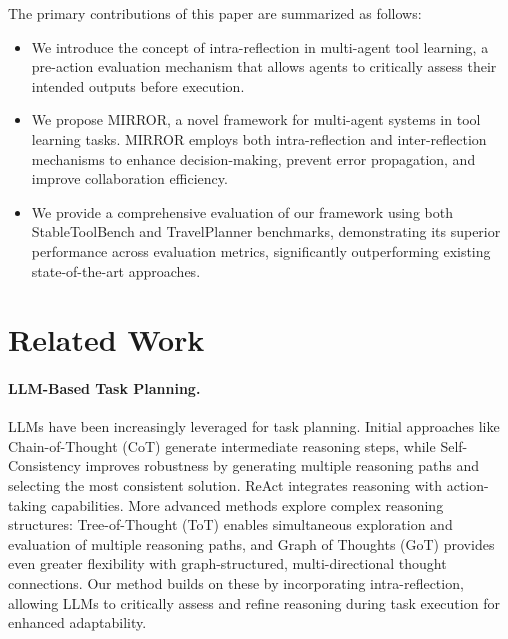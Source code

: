 \documentclass{article}
\begin{document}
The primary contributions of this paper are summarized as follows:

\begin{itemize}
\item We introduce the concept of intra-reflection in multi-agent tool learning, a pre-action evaluation mechanism that allows agents to critically assess their intended outputs before execution. 
\item We propose MIRROR, a novel framework for multi-agent systems in tool learning tasks. MIRROR employs both intra-reflection and inter-reflection mechanisms to enhance decision-making, prevent error propagation, and improve collaboration efficiency. 
\item We provide a comprehensive evaluation of our framework using both StableToolBench and TravelPlanner benchmarks, demonstrating its superior performance across evaluation metrics, significantly outperforming existing state-of-the-art approaches.
\end{itemize}

\section{Related Work}
\paragraph{LLM-Based Task Planning.} 
LLMs have been increasingly leveraged for task planning. Initial approaches like Chain-of-Thought (CoT) \cite{wei2022chain} generate intermediate reasoning steps, while Self-Consistency \cite{wang2022self} improves robustness by generating multiple reasoning paths and selecting the most consistent solution. ReAct \cite{yao2022react} integrates reasoning with action-taking capabilities. More advanced methods explore complex reasoning structures: Tree-of-Thought (ToT) \cite{yao2024tree} enables simultaneous exploration and evaluation of multiple reasoning paths, and Graph of Thoughts (GoT) \cite{besta2024graph} provides even greater flexibility with graph-structured, multi-directional thought connections. Our method builds on these by incorporating intra-reflection, allowing LLMs to critically assess and refine reasoning during task execution for enhanced adaptability.
\end{document}
